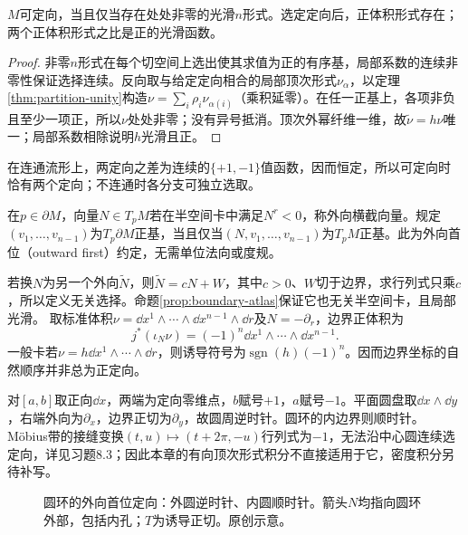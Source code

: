 \begin{proposition}[顶次形式判别]\label{prop:orientation-volume}
$M$可定向，当且仅当存在处处非零的光滑$n$形式。选定定向后，正体积形式存在；两个正体积形式之比是正的光滑函数。
\end{proposition}
\begin{proof}
非零$n$形式在每个切空间上选出使其求值为正的有序基，局部系数的连续非零性保证选择连续。反向取与给定定向相合的局部顶次形式$\nu_\alpha$，以定理\ref{thm:partition-unity}构造$\nu=\sum_i\rho_i\nu_{\alpha(i)}$（乘积延零）。在任一正基上，各项非负且至少一项正，所以$\nu$处处非零；没有异号抵消。顶次外幂纤维一维，故$\tilde\nu=h\nu$唯一；局部系数相除说明$h$光滑且正。
\end{proof}
在连通流形上，两定向之差为连续的$\{+1,-1\}$值函数，因而恒定，所以可定向时恰有两个定向；不连通时各分支可独立选取。

\begin{definition}[外向首位的边界定向]\label{def:boundary-orientation}
在$p\in\partial M$，向量$N\in T_pM$若在半空间卡中满足$N^r<0$，称外向横截向量。规定$(v_1,\ldots,v_{n-1})$为$T_p\partial M$正基，当且仅当$(N,v_1,\ldots,v_{n-1})$为$T_pM$正基。此为外向首位（outward first）约定，无需单位法向或度规。
\end{definition}
若换$N$为另一个外向$\tilde N$，则$\tilde N=cN+W$，其中$c>0$、$W$切于边界，求行列式只乘$c$，所以定义无关选择。命题\ref{prop:boundary-atlas}保证它也无关半空间卡，且局部光滑。
取标准体积$\nu=\dd x^1\wedge\cdots\wedge\dd x^{n-1}\wedge\dd r$及$N=-\partial_r$，边界正体积为
\[
 j^*(\iota_N\nu)=(-1)^n\dd x^1\wedge\cdots\wedge\dd x^{n-1}.
\]
一般卡若$\nu=h\dd x^1\wedge\cdots\wedge\dd r$，则诱导符号为$\operatorname{sgn}(h)(-1)^n$。因而边界坐标的自然顺序并非总为正定向。

\begin{example}[区间、圆盘与不可定向带]
对$[a,b]$取正向$\dd x$，两端为定向零维点，$b$赋号$+1$，$a$赋号$-1$。平面圆盘取$\dd x\wedge\dd y$，右端外向为$\partial_x$，边界正切为$\partial_y$，故圆周逆时针。圆环的内边界则顺时针。Möbius带的接缝变换$(t,u)\mapsto(t+2\pi,-u)$行列式为$-1$，无法沿中心圆连续选定向，详见习题8.3；因此本章的有向顶次形式积分不直接适用于它，密度积分另待补写。
\end{example}
\begin{figure}[htbp]
\centering
\caption{圆环的外向首位定向：外圆逆时针、内圆顺时针。箭头$N$均指向圆环外部，包括内孔；$T$为诱导正切。原创示意。}
\label{fig:boundary-orientation}
\end{figure}
